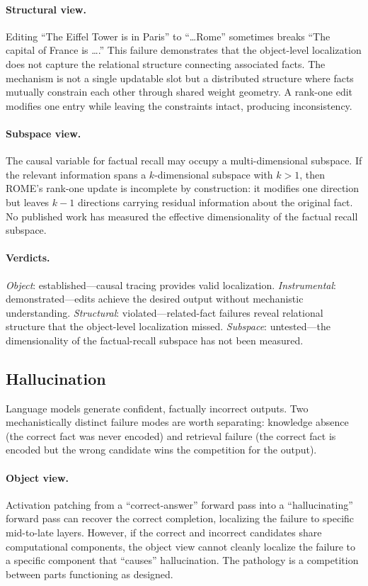 \documentclass{article}
\begin{document}
\paragraph{Structural view.}
Editing ``The Eiffel Tower is in Paris'' to ``\ldots Rome'' sometimes
breaks ``The capital of France is \ldots.'' This failure demonstrates
that the object-level localization does not capture the relational
structure connecting associated facts. The mechanism is not a single
updatable slot but a distributed structure where facts mutually constrain
each other through shared weight geometry. A rank-one edit modifies one
entry while leaving the constraints intact, producing inconsistency.

\paragraph{Subspace view.}
The causal variable for factual recall may occupy a multi-dimensional
subspace. If the relevant information spans a $k$-dimensional subspace
with $k > 1$, then ROME's rank-one update is incomplete by construction:
it modifies one direction but leaves $k - 1$ directions carrying residual
information about the original fact. No published work has measured the
effective dimensionality of the factual recall subspace.

\paragraph{Verdicts.}
\emph{Object}: established---causal tracing provides valid localization.
\emph{Instrumental}: demonstrated---edits achieve the desired output
without mechanistic understanding.
\emph{Structural}: violated---related-fact failures reveal relational
structure that the object-level localization missed.
\emph{Subspace}: untested---the dimensionality of the factual-recall
subspace has not been measured.


\subsection{Hallucination}\label{app:cs_hallucination}

Language models generate confident, factually incorrect outputs. Two
mechanistically distinct failure modes are worth separating: knowledge
absence (the correct fact was never encoded) and retrieval failure (the
correct fact is encoded but the wrong candidate wins the competition for
the output).

\paragraph{Object view.}
Activation patching from a ``correct-answer'' forward pass into a
``hallucinating'' forward pass can recover the correct completion,
localizing the failure to specific mid-to-late layers. However, if the
correct and incorrect candidates share computational components, the
object view cannot cleanly localize the failure to a specific component
that ``causes'' hallucination. The pathology is a competition between parts functioning as designed.
\end{document}
